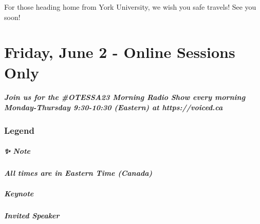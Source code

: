 \documentclass[
]{book}
\begin{document}
For those heading home from York University, we wish you safe travels! See you soon!

\hypertarget{friday-june-2---online-sessions-only}{%
\chapter{Friday, June 2 - Online Sessions Only}\label{friday-june-2---online-sessions-only}}

\begin{protip}
\hypertarget{join-us-for-the-otessa23-morning-radio-show-every-morning-monday-thursday-930-1030-eastern-at-httpsvoiced.ca}{%
\paragraph{Join us for the \#OTESSA23 Morning Radio Show every morning
Monday-Thursday 9:30-10:30 (Eastern) at
https://voiced.ca}\label{join-us-for-the-otessa23-morning-radio-show-every-morning-monday-thursday-930-1030-eastern-at-httpsvoiced.ca}}
\end{protip}

\hypertarget{legend-4}{%
\subsection*{Legend}\label{legend-4}}

\begin{protip}
\hypertarget{note}{%
\paragraph*{✨ Note}\label{note}}

\textbf{\emph{All times are in Eastern Time (Canada)}}
\end{protip}

\begin{keynote}
\hypertarget{keynote}{%
\paragraph{Keynote}\label{keynote}}
\end{keynote}

\begin{speaker}
\hypertarget{invited-speaker}{%
\paragraph{Invited Speaker}\label{invited-speaker}}
\end{speaker}
\end{document}
